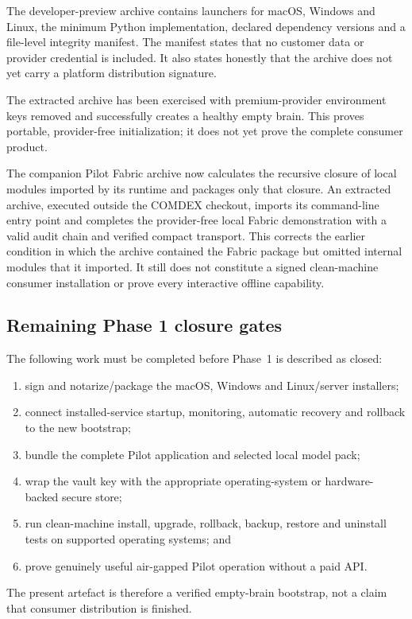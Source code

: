The developer-preview archive contains launchers for macOS, Windows and Linux,
the minimum Python implementation, declared dependency versions and a file-level
integrity manifest.  The manifest states that no customer data or provider
credential is included.  It also states honestly that the archive does not yet
carry a platform distribution signature.

The extracted archive has been exercised with premium-provider environment keys
removed and successfully creates a healthy empty brain.  This proves portable,
provider-free initialization; it does not yet prove the complete consumer
product.

The companion Pilot Fabric archive now calculates the recursive closure of local
modules imported by its runtime and packages only that closure.  An extracted
archive, executed outside the COMDEX checkout, imports its command-line entry
point and completes the provider-free local Fabric demonstration with a valid
audit chain and verified compact transport.  This corrects the earlier condition
in which the archive contained the Fabric package but omitted internal modules
that it imported.  It still does not constitute a signed clean-machine consumer
installation or prove every interactive offline capability.

\subsection{Remaining Phase 1 closure gates}

The following work must be completed before Phase~1 is described as closed:

\begin{enumerate}
  \item sign and notarize/package the macOS, Windows and Linux/server installers;
  \item connect installed-service startup, monitoring, automatic recovery and
  rollback to the new bootstrap;
  \item bundle the complete Pilot application and selected local model pack;
  \item wrap the vault key with the appropriate operating-system or
  hardware-backed secure store;
  \item run clean-machine install, upgrade, rollback, backup, restore and
  uninstall tests on supported operating systems; and
  \item prove genuinely useful air-gapped Pilot operation without a paid API.
\end{enumerate}

The present artefact is therefore a verified empty-brain bootstrap, not a claim
that consumer distribution is finished.
